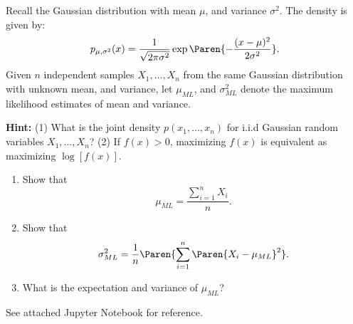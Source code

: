 \documentclass[11pt]{article}
\newenvironment{problem}[2][Problem]{\begin{trivlist}
\item[\hskip \labelsep {\bfseries #1}\hskip \labelsep {\bfseries #2.}]}{\end{trivlist}}
\begin{document}
\begin{problem}{4. (15 points)}
Recall the Gaussian distribution with mean $\mu$, and variance $\sigma^2$. The density is given by: 
\[
p_{\mu,\sigma^2}(x) = \frac1{\sqrt{2\pi\sigma^2}}\exp\Paren{-\frac{(x-\mu)^2}{2\sigma^2}}.
\]
Given $n$ independent samples $X_1, \ldots, X_n$ from the same Gaussian distribution with unknown mean, and variance, let $\mu_{ML}$, and $\sigma^2_{ML}$ denote the maximum likelihood estimates of mean and variance. 

\textbf{Hint:} (1) What is the joint density $p(x_1, \ldots, x_n)$ for i.i.d Gaussian random variables $X_1, \ldots, X_n$? (2) If $f(x)>0$, maximizing $f(x)$ is equivalent as maximizing $\log [f(x)]$.
\begin{enumerate}
	\item Show that 
	\[
	\mu_{ML} = \frac{\sum_{i=1}^n X_i}{n}.
	\]
	\item
	Show that 
	\[
	\sigma^2_{ML} = \frac1{n} \Paren{\sum_{i=1}^n \Paren{X_i-\mu_{ML}}^2}.
	\]
	\item What is the expectation and variance of $\mu_{ML}$?
\end{enumerate}
\end{problem}


\begin{problem}{5. (20 points)}
	See attached Jupyter Notebook for reference.
\end{problem}
\end{document}
